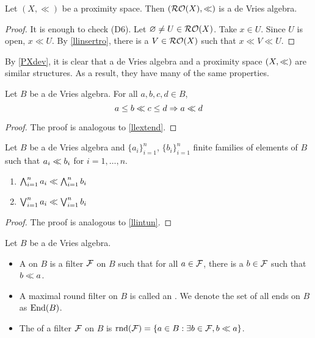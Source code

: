 \begin{example}
	Let \( (X,\ll) \) be a proximity space.  Then \( (\operatorname{\mathcal{RO}}(X),\ll) \) is a de Vries algebra.
\end{example}
\begin{proof}
	It is enough to check (D6).  Let \( \varnothing \neq U \in \operatorname{\mathcal{RO}}(X) \).  Take \( x \in U \).  Since \( U \) is open, \( x \ll U \).  By \ref{llinsertro}, there is a \( V \in \operatorname{\mathcal{RO}}(X) \) such that \( x \ll V \ll U \).
\end{proof}

\begin{remark}
	By \ref{PXdev}, it is clear that a de Vries algebra and a proximity space \( (X,\mathord{\ll}) \) are similar structures.  As a result, they have many of the same properties.
\end{remark}

\begin{proposition}
	\label{devextend}
	Let \( B \) be a de Vries algebra.  For all \( a,b,c,d \in B \),
	\[ a \leq b \ll c \leq d \Rightarrow a \ll d \]
\end{proposition}
\begin{proof}
	The proof is analogous to \ref{llextend}.
\end{proof}

\begin{proposition}
	\label{devwedgevee}
	Let \( B \) be a de Vries algebra and \( \{ a_i \}_{i=1}^n \), \( \{ b_i \}_{i=1}^n \) finite families of elements of \( B \) such that \( a_i \ll b_i \) for \( i=1, \dots, n \).
	\begin{enumerate}[label={(\arabic*)},ref={\theproposition(\arabic*)}]
		\item \label{devwedge}
			\( \bigwedge_{i=1}^n a_i \ll \bigwedge_{i=1}^n b_i \)
		\item \label{devvee}
			\( \bigvee_{i=1}^n a_i \ll \bigvee_{i=1}^n b_i \)
	\end{enumerate}
\end{proposition}
\begin{proof}
	The proof is analogous to \ref{llintun}.
\end{proof}

\begin{definition}
	Let \( B \) be a de Vries algebra.
	\begin{itemize}
		\item A  on \( B \) is a filter \( \mathcal{F} \) on \( B \) such that for all \( a \in \mathcal{F} \), there is a \( b \in \mathcal{F} \) such that \( b \ll a \).
		\item A maximal round filter on \( B \) is called an .  We denote the set of all ends on \( B \) as \( \operatorname{End}(B) \).
		\item The  of a filter \( \mathcal{F} \) on \( B \) is \( \operatorname{rnd}(\mathcal{F}) = \{ a \in B: \exists b \in \mathcal{F}, b \ll a \} \).
	\end{itemize}
\end{definition}

